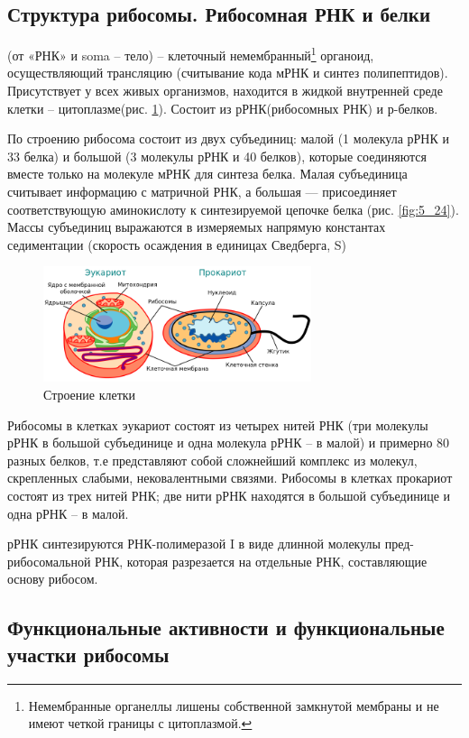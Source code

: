 \subsection{Структура рибосомы. Рибосомная РНК и белки}

(от «РНК» и soma – тело) -- клеточный немембранный\footnote{Немембранные органеллы лишены собственной замкнутой мембраны и не имеют четкой границы с цитоплазмой.} органоид, осуществляющий трансляцию (считывание кода мРНК и синтез полипептидов).  Присутствует у всех живых организмов, находится в жидкой внутренней среде клетки -- цитоплазме(рис. \ref{fig:5_1(cells)}). Состоит из рРНК(рибосомных РНК) и р-белков. 

По строению рибосома состоит из двух субъединиц: малой (1 молекула рРНК и 33 белка) и большой (3 молекулы рРНК и 40 белков), которые  соединяются вместе только на молекуле мРНК для синтеза белка. Малая субъединица считывает информацию с матричной РНК, а большая — присоединяет соответствующую аминокислоту к синтезируемой цепочке белка (рис. \ref{fig:5_24}). Массы субъединиц выражаются в измеряемых напрямую константах седиментации (скорость осаждения в единицах Сведберга, S)

\begin{figure}[h]
    \centering
    \includegraphics[width=0.7\textwidth]{Pictures/5_1(cell)}
    \caption{Строение клетки}
    \label{fig:5_1(cells)}
\end{figure}

Рибосомы в клетках эукариот состоят из четырех нитей РНК (три молекулы рРНК в большой субъединице и одна молекула рРНК – в малой) и примерно 80 разных белков, т.е представляют собой сложнейший комплекс из молекул, скрепленных слабыми, нековалентными связями. Рибосомы в клетках прокариот состоят из трех нитей РНК; две нити рРНК находятся в большой субъединице и одна рРНК – в малой. 

рРНК синтезируются РНК-полимеразой I в виде длинной молекулы пред-рибосомальной РНК, которая разрезается на отдельные РНК, составляющие основу рибосом.

\subsection{Функциональные активности и функциональные участки рибосомы}

